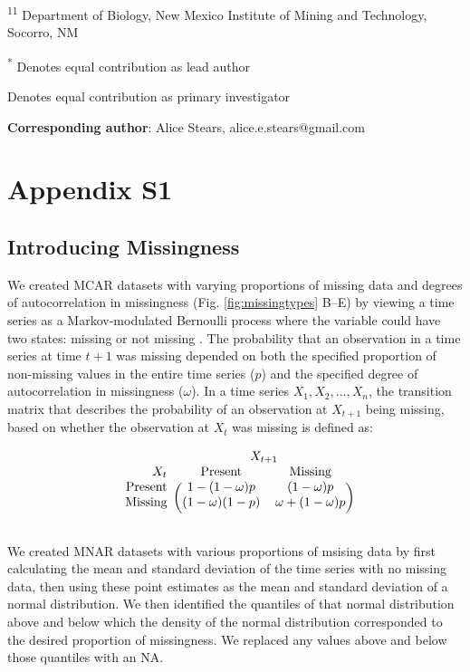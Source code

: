 \documentclass[12pt,english]{article} %
\begin{document}
\noindent\textsuperscript{11} Department of Biology, New Mexico Institute of Mining and Technology, Socorro, NM

\noindent\textsuperscript{*} Denotes equal contribution as lead author

\noindent{$^{\circ}$} Denotes equal contribution as primary investigator

\noindent \textbf{Corresponding author}: Alice Stears, alice.e.stears@gmail.com 


\section*{Appendix S1}


\subsection*{Introducing Missingness}

We created MCAR datasets with varying proportions of missing data and degrees of autocorrelation in missingness (Fig. \ref{fig:missingtypes} B--E) by viewing a time series as a Markov-modulated Bernoulli process where the variable could have two states: missing or not missing \citep{Gharib2014, Edwards1960}. The probability that an observation in a time series at time $t+1$ was missing depended on both the specified proportion of non-missing values in the entire time series ($p$) and the specified degree of autocorrelation in missingness ($\omega$). In a time series $X_1, X_2, ..., X_n$, the transition matrix that describes the probability of an observation at $X_{t+1}$ being missing, based on whether the observation at $X_t$ was missing is defined as: 


\begin{equation}
\begin{blockarray}{rcccc}
\text{} & \BAmulticolumn{4}{c}{X_{t+1}}\\
X_t & \text{Present} & \text{Missing}  \\
\begin{block}{r(cccc)}
\text{Present} & 1-(1-\omega)p & (1-\omega)p \\
\text{Missing} & (1-\omega)(1-p) & \omega + (1-\omega)p  \\
[1ex]
\end{block}
\end{blockarray}
\end{equation}


We created MNAR datasets with various proportions of msising data by first calculating the mean and standard deviation of the time series with no missing data, then using these point estimates as the mean and standard deviation of a normal distribution. We then identified the quantiles of that normal distribution above and below which the density of the normal distribution corresponded to the desired proportion of missingness. We replaced any values above and below those quantiles with an NA.
\end{document}
